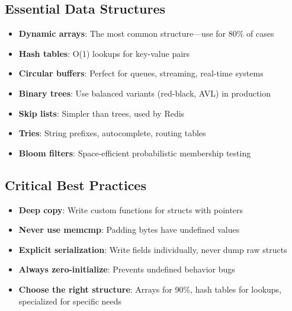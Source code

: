 \subsection{Essential Data Structures}

\begin{itemize}
    \item \textbf{Dynamic arrays}: The most common structure---use for 80\% of cases
    \item \textbf{Hash tables}: O(1) lookups for key-value pairs
    \item \textbf{Circular buffers}: Perfect for queues, streaming, real-time systems
    \item \textbf{Binary trees}: Use balanced variants (red-black, AVL) in production
    \item \textbf{Skip lists}: Simpler than trees, used by Redis
    \item \textbf{Tries}: String prefixes, autocomplete, routing tables
    \item \textbf{Bloom filters}: Space-efficient probabilistic membership testing
\end{itemize}

\subsection{Critical Best Practices}

\begin{itemize}
    \item \textbf{Deep copy}: Write custom functions for structs with pointers
    \item \textbf{Never use memcmp}: Padding bytes have undefined values
    \item \textbf{Explicit serialization}: Write fields individually, never dump raw structs
    \item \textbf{Always zero-initialize}: Prevents undefined behavior bugs
    \item \textbf{Choose the right structure}: Arrays for 90\%, hash tables for lookups, specialized for specific needs
\end{itemize}

